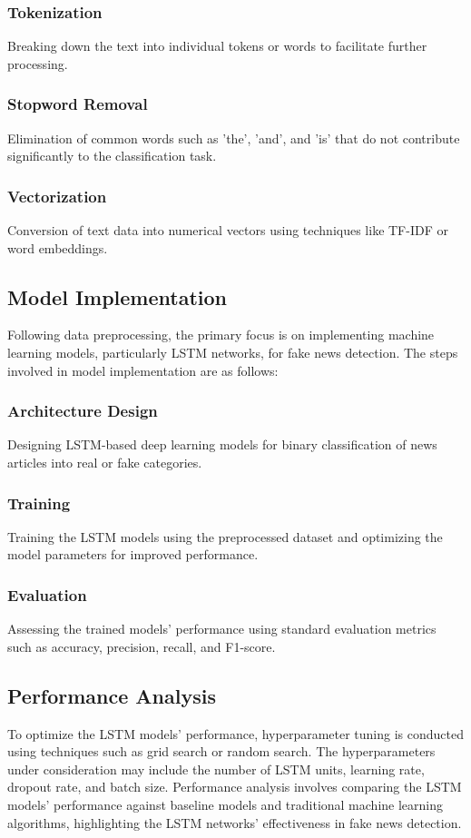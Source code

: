 \subsubsection{Tokenization}
 Breaking down the text into individual tokens or words to facilitate further processing.
\subsubsection{Stopword Removal}
 Elimination of common words such as 'the', 'and', and 'is' that do not contribute significantly to the classification task.
\subsubsection{Vectorization}
 Conversion of text data into numerical vectors using techniques like TF-IDF or word embeddings.
\subsection{Model Implementation}

Following data preprocessing, the primary focus is on implementing machine learning models, particularly LSTM networks, for fake news detection. The steps involved in model implementation are as follows:

\subsubsection{Architecture Design}
 Designing LSTM-based deep learning models for binary classification of news articles into real or fake categories.
\subsubsection{Training}
 Training the LSTM models using the preprocessed dataset and optimizing the model parameters for improved performance.
\subsubsection{Evaluation}
 Assessing the trained models' performance using standard evaluation metrics such as accuracy, precision, recall, and F1-score.
\subsection{Performance Analysis}

To optimize the LSTM models' performance, hyperparameter tuning is conducted using techniques such as grid search or random search. The hyperparameters under consideration may include the number of LSTM units, learning rate, dropout rate, and batch size. Performance analysis involves comparing the LSTM models' performance against baseline models and traditional machine learning algorithms, highlighting the LSTM networks' effectiveness in fake news detection.
 

